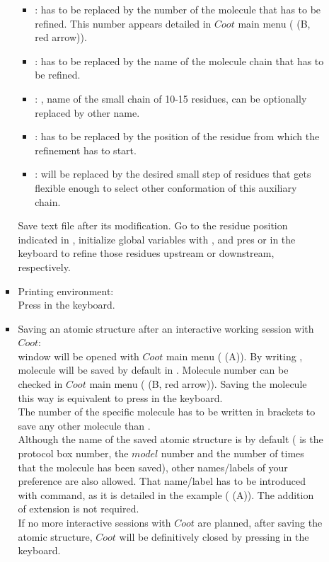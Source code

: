 \begin{itemize}
\begin{itemize}
\begin{itemize}
\begin{itemize}
      \item {}:  has to be replaced by the number of the molecule that has to be refined. This number appears detailed in $Coot$ main menu  ( (B, red arrow)).
      \item {}:  has to be replaced by the name of the molecule chain that has to be refined.
      \item {}: , name of the small chain of 10-15 residues, can be optionally replaced by other name.
      \item {}:  has to be replaced by the position of the residue from which the refinement has to start.
      \item {}:  will be replaced by the desired small step of residues that gets flexible enough to select other conformation of this auxiliary chain.

     \end{itemize} 
     Save  text file after its modification. Go to the residue position indicated in , initialize global variables with , and pres  or  in the keyboard to refine those  residues upstream or downstream, respectively.
     \item Printing \coot environment:\\ Press  in the keyboard.
     \item Saving an atomic structure after an interactive working session with $Coot$:\\
      window will be opened with $Coot$ main menu  ( (A)). By writing , molecule  will be saved by default in \scipion. Molecule number can be checked in $Coot$ main menu  ( (B, red arrow)). Saving the molecule this way is equivalent to press  in the keyboard.\\The number  of the specific molecule has to be written in brackets to save any other molecule than .\\Although the name of the saved atomic structure is  by default ( is the protocol box number,  the $model$ number and  the number of times that the molecule has been saved), other names/labels of your preference are also allowed. That name/label has to be introduced with  command, as it is detailed in the example ( (A)). The addition of  extension is not required.\\If no more interactive sessions with $Coot$ are planned, after saving the atomic structure, $Coot$ will be definitively closed by pressing  in the keyboard.     
     

\end{itemize}
\end{itemize}
\end{itemize}
